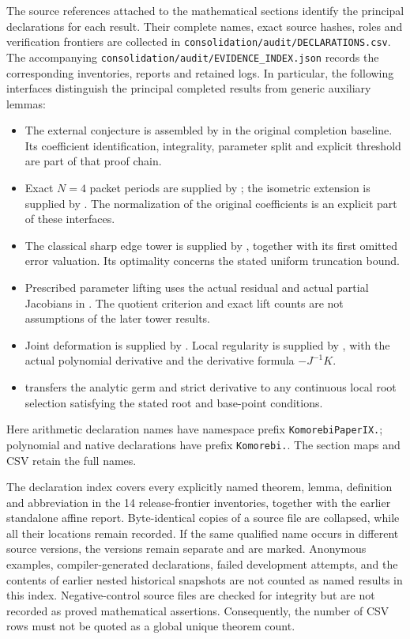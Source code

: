 The source references attached to the mathematical sections identify the
principal declarations for each result. Their complete names, exact source
hashes, roles and verification frontiers are collected in
\texttt{consolidation/audit/DECLARATIONS.csv}. The accompanying
\nolinkurl{consolidation/audit/EVIDENCE_INDEX.json} records the corresponding inventories,
reports and retained logs. In particular, the following interfaces distinguish
the principal completed results from generic auxiliary lemmas:
\begin{itemize}
\item The external conjecture is assembled by
 in the original completion
baseline. Its coefficient identification, integrality, parameter split and
explicit threshold are part of that proof chain.
\item Exact $N=4$ packet periods are supplied by
; the isometric extension
is supplied by . The
normalization of the original coefficients is an explicit part of these
interfaces.
\item The classical sharp edge tower is supplied by
, together with its
first omitted error valuation. Its optimality concerns the stated uniform
truncation bound.
\item Prescribed parameter lifting uses the actual residual and actual
partial Jacobians in
.
The quotient criterion and exact lift counts are not assumptions of the
later tower results.
\item Joint deformation is supplied by
.
Local regularity is supplied by
, with the
actual polynomial derivative and the derivative formula $-J^{-1}K$.
\item {}
transfers the analytic germ and strict derivative to any continuous local
root selection satisfying the stated root and base-point conditions.
\end{itemize}
Here arithmetic declaration names have namespace prefix
\texttt{KomorebiPaperIX.}; polynomial and native declarations have prefix
\texttt{Komorebi.}. The section maps and CSV retain the full names.

The declaration index covers every explicitly named theorem, lemma,
definition and abbreviation in the 14 release-frontier inventories, together
with the earlier standalone affine report. Byte-identical copies of a source
file are collapsed, while all their locations remain recorded. If the same
qualified name occurs in different source versions, the versions remain
separate and are marked. Anonymous examples, compiler-generated declarations,
failed development attempts, and the contents of earlier nested historical
snapshots are not counted as named results in this index. Negative-control
source files are checked for integrity but are not recorded as proved
mathematical assertions. Consequently, the number of CSV rows must not be
quoted as a global unique theorem count.

